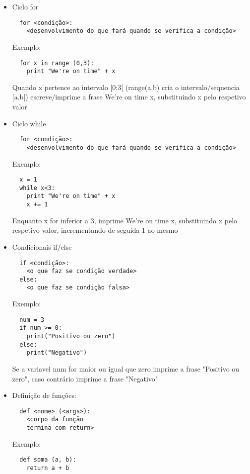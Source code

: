 \documentclass{article}
\begin{document}
\begin{itemize}
\begin{itemize}
  \end{itemize}  
  
  \item Ciclo for
  \begin{lstlisting}
  for <condição>:
	<desenvolvimento do que fará quando se verifica a condição>
  \end{lstlisting}  
  
  Exemplo:
  \begin{lstlisting}
  for x in range (0,3): 
  	print "We're on time" + x 	
  \end{lstlisting}
  Quando x pertence ao intervalo [0;3[ (range(a,b) cria o intervalo/sequencia [a.b[) escreve/imprime a frase We're on time x, substituindo x pelo respetivo valor
  
  \item Ciclo while  
  \begin{lstlisting}
  for <condição>:
	<desenvolvimento do que fará quando se verifica a condição>
  \end{lstlisting} 
  
  Exemplo:
  \begin{lstlisting}
  x = 1  
  while x<3: 
  	print "We're on time" + x
  	x += 1
  \end{lstlisting}
  Enquanto x for inferior a 3, imprime We're on time x, substituindo x pelo respetivo valor, incrementando de seguida 1 ao mesmo
  
  \item Condicionais if/else
  \begin{lstlisting}
  if <condição>:
  	<o que faz se condição verdade>
  else:
  	<o que faz se condição falsa>
  \end{lstlisting}
  
  Exemplo:
  
  \begin{lstlisting}
  num = 3
  if num >= 0:
  	print("Positivo ou zero")
  else:
  	print("Negativo")
  \end{lstlisting}
  Se a variavel num for maior ou igual que zero imprime a frase "Positivo ou zero", caso contr\'ario imprime a frase "Negativo"
  
  \item Defini\c c\~ao de fun\c c\~oes:
  
  \begin{lstlisting}
  def <nome> (<args>):
  	<corpo da função
  	termina com return>
  \end{lstlisting}
  
  Exemplo:
  \begin{lstlisting}
  def soma (a, b):
	return a + b
  \end{lstlisting}  
  
\end{itemize}
\end{document}

